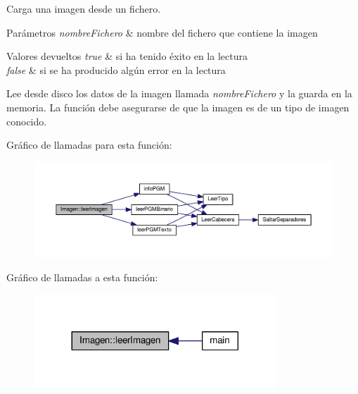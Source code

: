 Carga una imagen desde un fichero. 


\begin{DoxyParams}{Parámetros}
{\em nombre\+Fichero} & nombre del fichero que contiene la imagen \\
\hline
\end{DoxyParams}

\begin{DoxyRetVals}{Valores devueltos}
{\em true} & si ha tenido éxito en la lectura \\
\hline
{\em false} & si se ha producido algún error en la lectura\\
\hline
\end{DoxyRetVals}
Lee desde disco los datos de la imagen llamada {\itshape nombre\+Fichero} y la guarda en la memoria. La función debe asegurarse de que la imagen es de un tipo de imagen conocido. 

Gráfico de llamadas para esta función\+:
\nopagebreak
\begin{figure}[H]
\begin{center}
\leavevmode
\includegraphics[width=350pt]{class_imagen_aa46cc99da218afa01f55395e4c96ffe0_cgraph}
\end{center}
\end{figure}




Gráfico de llamadas a esta función\+:
\nopagebreak
\begin{figure}[H]
\begin{center}
\leavevmode
\includegraphics[width=257pt]{class_imagen_aa46cc99da218afa01f55395e4c96ffe0_icgraph}
\end{center}
\end{figure}


\hypertarget{class_imagen_a0266a25af1413cb57d9da880e7881860}{}
